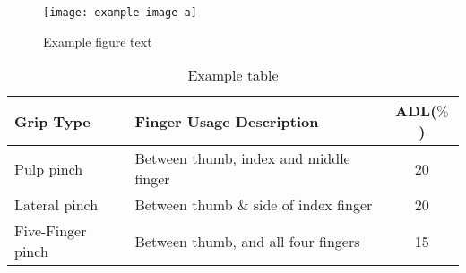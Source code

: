 \documentclass[../main.tex]{subfiles}
\begin{document}
\begin{figure}[h]
\begin{center}
\texttt{[image: example-image-a]}
\caption{Example figure text}
\label{fig:template}
\end{center}
\end{figure}

\begin{table}
\begin{center}
\begin{tabular}{ |l|l|c| } 
 \hline
 Grip Type & Finger Usage Description & ADL($\%$) \\ 
 \hline
 Pulp pinch & Between thumb, index and middle finger & 20 \\ 
 Lateral pinch & Between thumb \& side of index finger & 20 \\ 
 Five-Finger pinch & Between thumb, and all four fingers & 15 \\ 
 \hline
\end{tabular}
\caption{Example table}
\label{tab:??}
\end{center}
\end{table}
\end{document}
